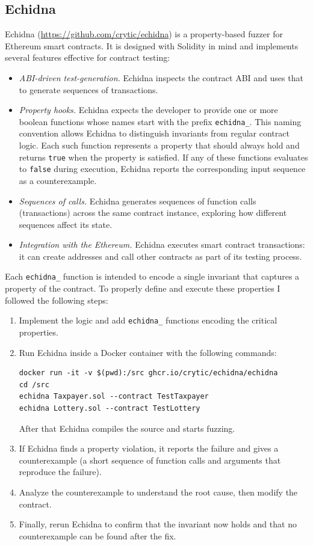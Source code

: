 \subsection{Echidna}
Echidna (\href{https://github.com/crytic/echidna}{https://github.com/crytic/echidna}) is a property-based fuzzer for Ethereum smart contracts. It is designed with Solidity in mind and implements several features effective for contract testing:
\begin{itemize}
    \item \textit{ABI-driven test-generation.} Echidna inspects the contract ABI and uses that to generate sequences of transactions.  
    
    \item \textit{Property hooks.} Echidna expects the developer to provide one or more boolean functions whose names start with the prefix \texttt{echidna\_}. 
    This naming convention allows Echidna to distinguish invariants from regular contract logic.
    Each such function represents a property that should always hold and returns \texttt{true} when the property is satisfied. If any of these functions evaluates to \texttt{false} during execution, Echidna reports the corresponding input sequence as a counterexample.
    
    \item \textit{Sequences of calls.} Echidna generates sequences of function calls (transactions) across the same contract instance, exploring how different sequences affect its state.
    
    \item \textit{Integration with the Ethereum.} Echidna executes smart contract transactions: it can create addresses and call other contracts as part of its testing process.
\end{itemize}

Each \texttt{echidna\_} function is intended to encode a single invariant that captures a property of the contract. To properly define and execute these properties I followed the following steps:
\begin{enumerate}
    \item Implement the logic and add \texttt{echidna\_} functions encoding the critical properties.
    \item Run Echidna inside a Docker container with the following commands:
    \begin{lstlisting}
docker run -it -v $(pwd):/src ghcr.io/crytic/echidna/echidna 
cd /src 
echidna Taxpayer.sol --contract TestTaxpayer 
echidna Lottery.sol --contract TestLottery
    \end{lstlisting}
    After that Echidna compiles the source and starts fuzzing.
    \item If Echidna finds a property violation, it reports the failure and gives a counterexample (a short sequence of function calls and arguments that reproduce the failure).
    \item Analyze the counterexample to understand the root cause, then modify the contract.
    \item Finally, rerun Echidna to confirm that the invariant now holds and that no counterexample can be found after the fix.
\end{enumerate}

